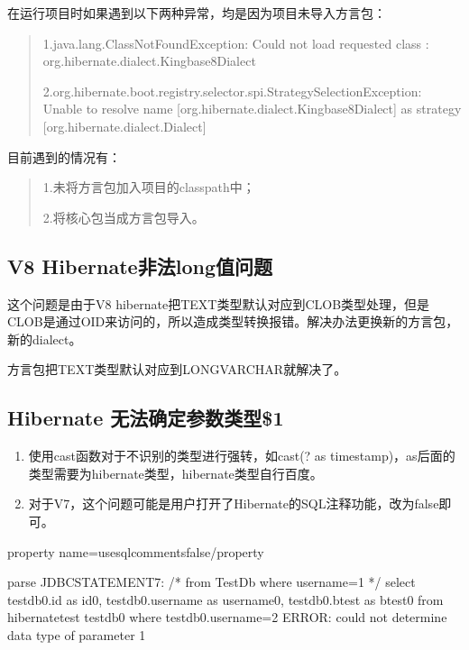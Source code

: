 \documentclass[a4,10pt,oneside,english]{sphinxmanual}
\begin{document}
在运行项目时如果遇到以下两种异常，均是因为项目未导入方言包：
\begin{quote}

1.java.lang.ClassNotFoundException: Could not load requested class : org.hibernate.dialect.Kingbase8Dialect

2.org.hibernate.boot.registry.selector.spi.StrategySelectionException: Unable to resolve name {[}org.hibernate.dialect.Kingbase8Dialect{]} as strategy {[}org.hibernate.dialect.Dialect{]}
\end{quote}

目前遇到的情况有：
\begin{quote}

1.未将方言包加入项目的classpath中；

2.将核心包当成方言包导入。
\end{quote}


\subsection{V8 Hibernate非法long值问题}
\label{\detokenize{interface/hibernate:v8-hibernatelong}}
这个问题是由于V8 hibernate把TEXT类型默认对应到CLOB类型处理，但是CLOB是通过OID来访问的，所以造成类型转换报错。解决办法更换新的方言包，新的dialect。

方言包把TEXT类型默认对应到LONGVARCHAR就解决了。


\subsection{Hibernate 无法确定参数类型\$1}
\label{\detokenize{interface/hibernate:hibernate-1}}\begin{enumerate}
%
\item {} 
使用cast函数对于不识别的类型进行强转，如cast(? as timestamp)，as后面的类型需要为hibernate类型，hibernate类型自行百度。

\item {} 
对于V7，这个问题可能是用户打开了Hibernate的SQL注释功能，改为false即可。

\end{enumerate}

\begin{sphinxVerbatim}[commandchars=\\\{\}]
\PYGZlt{}property name=\PYGZdq{}use\PYGZus{}sql\PYGZus{}comments\PYGZdq{}\PYGZgt{}false\PYGZlt{}/property\PYGZgt{}

parse JDBC\PYGZus{}STATEMENT\PYGZus{}7: /* from TestDb  where username=\PYGZdl{}1 */ select testdb0\PYGZus{}.id as id0\PYGZus{}, testdb0\PYGZus{}.username as username0\PYGZus{}, testdb0\PYGZus{}.btest as btest0\PYGZus{} from hibernate\PYGZus{}test testdb0\PYGZus{} where testdb0\PYGZus{}.username=\PYGZdl{}2
ERROR:  could not determine data type of parameter \PYGZdl{}1
\end{sphinxVerbatim}
\end{document}
